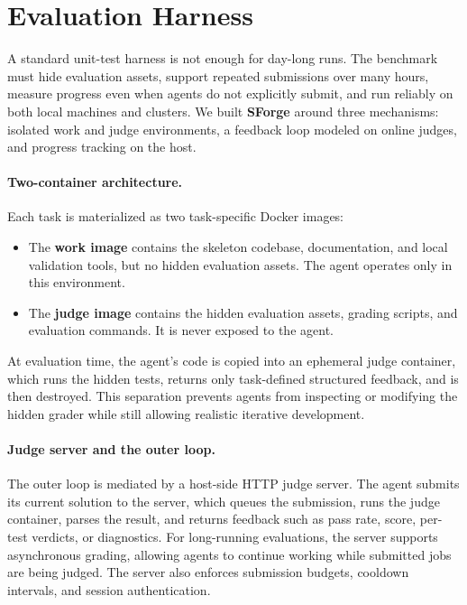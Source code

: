 \section{Evaluation Harness}
\label{sec:construction}
\label{sec:harness}

A standard unit-test harness is not enough for day-long runs. The benchmark must hide evaluation assets, support repeated submissions over many hours, measure progress even when agents do not explicitly submit, and run reliably on both local machines and clusters. We built \textbf{SForge} around three mechanisms: isolated work and judge environments, a feedback loop modeled on online judges, and progress tracking on the host.

\paragraph{Two-container architecture.}
Each task is materialized as two task-specific Docker images:
\begin{itemize}
    \item The \textbf{work image} contains the skeleton codebase, documentation, and local validation tools, but no hidden evaluation assets. The agent operates only in this environment.
    \item The \textbf{judge image} contains the hidden evaluation assets, grading scripts, and evaluation commands. It is never exposed to the agent.
\end{itemize}
At evaluation time, the agent's code is copied into an ephemeral judge container, which runs the hidden tests, returns only task-defined structured feedback, and is then destroyed. This separation prevents agents from inspecting or modifying the hidden grader while still allowing realistic iterative development.

\paragraph{Judge server and the outer loop.}
The outer loop is mediated by a host-side HTTP judge server. The agent submits its current solution to the server, which queues the submission, runs the judge container, parses the result, and returns feedback such as pass rate, score, per-test verdicts, or diagnostics. For long-running evaluations, the server supports asynchronous grading, allowing agents to continue working while submitted jobs are being judged. The server also enforces submission budgets, cooldown intervals, and session authentication.

